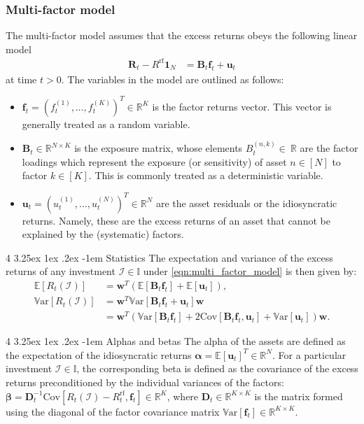 \documentclass[12pt]{article}
\makeatletter
\renewcommand\paragraph{%
	\@startsection{paragraph}
	{4}
	{\z@}
	{3.25ex \@plus1ex \@minus.2ex}
	{-1em}
	{\normalfont\normalsize\bfseries\maybe@addperiod}%
}
\newcommand{\maybe@addperiod}[1]{%
	#1\@addpunct{.}%
}
\makeatother
\begin{document}
\subsubsection{Multi-factor model} The multi-factor model assumes that the excess returns obeys the following linear model
\begin{align}
	\mathbf{R}_t - R^{\text{rf}} \mathbf{1}_N 
	&= \mathbf{B}_t \mathbf{f}_t + \mathbf{u}_t
	\label{eqn:multi_factor_model}
\end{align}
at time $t>0$. The variables in the model are outlined as follows:
\begin{itemize}
	\item $\mathbf{f}_t = (f_t^{(1)}, \dots, f_t^{(K)})^T \in \mathbb{R}^K$ is the factor returns vector. This vector is generally treated as a random variable.
	\item $\mathbf{B}_t \in \mathbb{R}^{N \times K}$ is the exposure matrix, whose elements $B_t^{(n, k)} \in\ \mathbb{R}$ are the factor loadings which represent the exposure (or sensitivity) of asset $n \in [N]$ to factor $k \in [K]$. This is commonly treated as a deterministic variable.
	\item $\mathbf{u}_t = (u_t^{(1)}, \dots, u_t^{(N)})^T \in \mathbb{R}^N$ are the asset residuals or the idiosyncratic returns. Namely, these are the excess returns of an asset that cannot be explained by the (systematic) factors.
\end{itemize}

\paragraph{Statistics} The expectation and variance of the excess returns of any investment $\mathcal{I} \in \mathbb{I}$ under \eqref{eqn:multi_factor_model} is then given by:
\begin{align}
	\mathbb{E}[R_t(\mathcal{I})] &= \mathbf{w}^T (\mathbb{E}[\mathbf{B}_t \mathbf{f}_t] + \mathbb{E}[\mathbf{u}_t]),
	\\
	\mathbb{V}\text{ar}[R_t(\mathcal{I})] 
	&= \mathbf{w}^T \mathbb{V}\text{ar}[\mathbf{B}_t \mathbf{f}_t + \mathbf{u}_t] \mathbf{w}
	\\
	&= \mathbf{w}^T \left(\mathbb{V}\text{ar}[\mathbf{B}_t \mathbf{f}_t] + 2\text{Cov}[\mathbf{B}_t \mathbf{f}_t, \mathbf{u}_t] + \mathbb{V}\text{ar}[\mathbf{u}_t]\right) \mathbf{w}.
\end{align}

\paragraph{Alphas and betas} The alpha of the assets are defined as the expectation of the idiosyncratic returns $\boldsymbol{\alpha} = \mathbb{E}[\mathbf{u}_t]^T \in \mathbb{R}^N$. For a particular investment $\mathcal{I} \in \mathbb{I}$, the corresponding beta is defined as the covariance of the excess returns preconditioned by the individual variances of the factors: $\boldsymbol{\beta} = \mathbf{D}_t^{-1} \text{Cov}[R_t(\mathcal{I}) - R^{\text{rf}}_t, \mathbf{f}_t] \in \mathbb{R}^K$, where $\mathbf{D}_t \in \mathbb{R}^{K \times K}$ is the matrix formed using the diagonal of the factor covariance matrix $\mathbb{V}\text{ar}[\mathbf{f}_t] \in \mathbb{R}^{K \times K}$.
\end{document}
